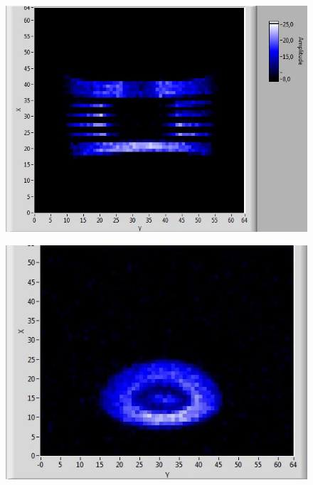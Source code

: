 \documentclass[a4paper]{scrartcl} %
\begin{document}
\begin{figure}[htbp]
{		\parbox{0.48\textwidth}{
			\centering
			\includegraphics[width=1.0 \linewidth]{./Resources/Teil_3/ptfe_vert.JPG}
			\label{fig:2d_teflon}}
		\hfill  
		\parbox{0.48\textwidth}{
			\centering
			\includegraphics[width=1.0 \linewidth]{./Resources/Teil_3/olive_2d.JPG}
			\label{fig:2d_olive}}
		
		\bigskip
		
}
\end{figure}
\end{document}
